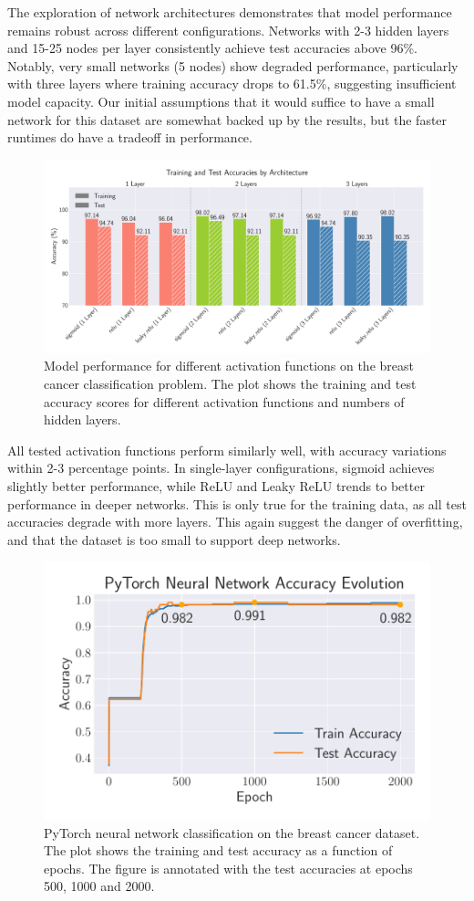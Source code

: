 \documentclass[aps,pra,english,notitlepage,reprint,nofootinbib]{revtex4-1}  %
\begin{document}
The exploration of network architectures demonstrates that model performance remains robust across different configurations. Networks with 2-3 hidden layers and 15-25 nodes per layer consistently achieve test accuracies above 96\%. Notably, very small networks (5 nodes) show degraded performance, particularly with three layers where training accuracy drops to 61.5\%, suggesting insufficient model capacity. Our initial assumptions that it would suffice to have a small network for this dataset are somewhat backed up by the results, but the faster runtimes do have a tradeoff in performance.

\onecolumngrid
\begin{figure}[h!]
    \centering
    \includegraphics[width = .9\textwidth]{../figs/classification_activations_layers.pdf}
    \caption{Model performance for different activation functions on the breast cancer classification problem. The plot shows the training and test accuracy scores for different activation functions and numbers of hidden layers.}
    \label{fig:NN_Classification_activations_layers}
\end{figure}
\twocolumngrid

All tested activation functions perform similarly well, with accuracy variations within 2-3 percentage points. In single-layer configurations, sigmoid achieves slightly better performance, while ReLU and Leaky ReLU trends to better performance in deeper networks. This is only true for the training data, as all test accuracies degrade with more layers. This again suggest the danger of overfitting, and that the dataset is too small to support deep networks. 

\begin{figure}[h!]
    \centering
    \includegraphics[width =.45\textwidth]{../figs/nn_torch_breast_cancer.pdf}
    \caption{PyTorch neural network classification on the breast cancer dataset. The plot shows the training and test accuracy as a function of epochs. The figure is annotated with the test accuracies at epochs 500, 1000 and 2000.}
    \label{fig:NN_Torch_breast_cancer}
\end{figure}
\end{document}
